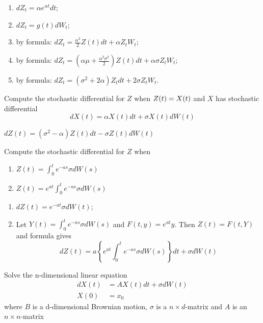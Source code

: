 \documentclass[12pt,a4paper]{exam}
\begin{document}
\begin{questions}
\begin{solution}
\begin{enumerate}[label=(\alph*),font=\itshape]
\item $dZ_t= \alpha e^{\alpha t}dt$;
\item $dZ_t = g(t) dW_t$;
\item by \ito formula: $dZ_t = \frac{\alpha^2}{2}Z(t)dt + \alpha Z_t W_t$;
\item by \ito formula: $dZ_t = (\alpha\mu + \frac{\alpha^2\sigma^2}{2})Z(t)dt + \alpha \sigma Z_t W_t$;
\item by \ito formula: $dZ_t = (\sigma^2 + 2\alpha)Z_t dt + 2\sigma Z_t W_t$.
\end{enumerate}
\end{solution}

\question Compute the stochastic differential for $Z$ when $Z(t) = \/X(t)$ and $X$ has stochastic differential 
\begin{equation*}
dX(t) = \alpha X(t) dt + \sigma X(t) dW(t)
\end{equation*}
\fillwithlines{3cm}
\begin{solution}
$dZ(t)=(\sigma^2 - \alpha)Z(t)dt -\sigma Z(t)dW(t)$
\end{solution}

\question Compute the stochastic differential for $Z$ when
\begin{enumerate}[label=(\alph*),font=\itshape]
\item $Z(t) = \int_0^t e^{-as}\sigma dW(s)$
\item $Z(t) = e^{at}\int_0^t e^{-as}\sigma dW(s)$
\end{enumerate}
\fillwithlines{3cm}

\begin{solution}
\begin{enumerate}[label=(\alph*),font=\itshape]
\item $dZ(t) = e^{-at}\sigma dW(t)$;
\item Let $Y(t)=\int_0^t e^{-as}\sigma dW(s)$ and $F(t, y)=e^{at}y$. Then $Z(t)=F(t, Y)$ and \ito formula gives
\begin{equation*}
dZ(t) = a\left\{e^{at}\int_0^t e^{-as}\sigma dW(s)\right\}dt + \sigma dW(t)
\end{equation*}
\end{enumerate}
\end{solution}

\question Solve the n-dimensional linear equation
\begin{equation*}
\begin{aligned}
dX(t) &= AX(t) dt + \sigma dW(t)\\
X(0) &= x_0
\end{aligned}
\end{equation*}
where $B$ is a d-dimensional Brownian motion, $\sigma$ is a $n\times d$-matrix and $A$ is an $n\times n$-matrix
\fillwithlines{3cm}


\end{questions}
\end{document}
